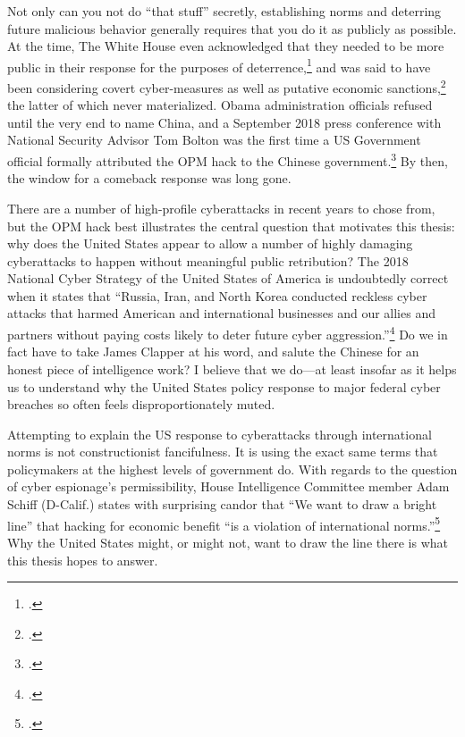 \documentclass[12pt]{article}
\begin{document}
Not only can you not do ``that stuff'' secretly, establishing norms and deterring future malicious behavior generally requires that you do it as publicly as possible. At the time, The White House even acknowledged that they needed to be more public in their response for the purposes of deterrence,\footcite{sanger_u.s._2017} and was said to have been considering covert cyber-measures as well as putative economic sanctions,\footcite{nakashima_hacks_2015} the latter of which never materialized. Obama administration officials refused until the very end to name China, and a September 2018 press conference with National Security Advisor Tom Bolton was the first time a US Government official formally attributed the OPM hack to the Chinese government.\footcite{sanger_trump_2018} By then, the window for a comeback response was long gone.

There are a number of high-profile cyberattacks in recent years to chose from, but the OPM hack best illustrates the central question that motivates this thesis: why does the United States appear to allow a number of highly damaging cyberattacks to happen without meaningful public retribution? The 2018 National Cyber Strategy of the United States of America is undoubtedly correct when it states that ``Russia, Iran, and North Korea conducted reckless cyber attacks that harmed American and international businesses and our allies and partners without paying costs likely to deter future cyber aggression.''\footcite{trump_national_2018} Do we in fact have to take James Clapper at his word, and salute the Chinese for an honest piece of intelligence work? I believe that we do---at least insofar as it helps us to understand why the United States policy response to major federal cyber breaches so often feels disproportionately muted. 

Attempting to explain the US response to cyberattacks through international norms is not constructionist fancifulness. It is using the exact same terms that policymakers at the highest levels of government do. With regards to the question of cyber espionage's permissibility, House Intelligence Committee member Adam Schiff (D-Calif.) states with surprising candor that ``We want to draw a bright line” that hacking for economic benefit “is a violation of international norms.''\footcite{nakashima_hacks_2015} Why the United States might, or might not, want to draw the line there is what this thesis hopes to answer.
\end{document}
